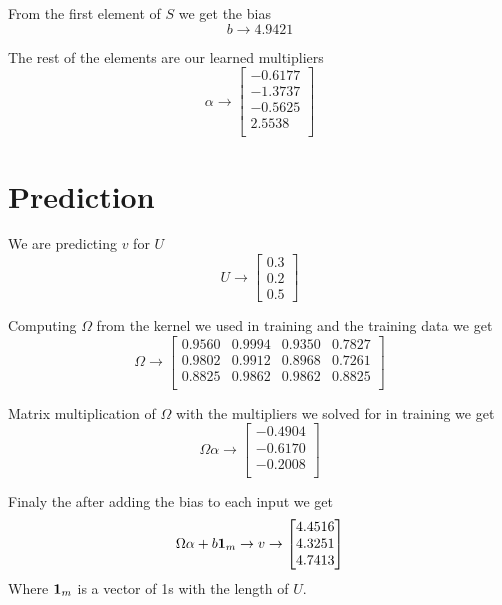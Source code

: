 \documentclass[a4paper,12pt]{scrreprt}
\begin{document}
From the first element of $S$ we get the bias
\begin{equation}
        b\to 4.9421
\end{equation}

The rest of the elements are our learned multipliers
\begin{equation}
        \alpha \to \begin{bmatrix}
                -0.6177 \\
                -1.3737 \\
                -0.5625 \\
                2.5538  \\
        \end{bmatrix}
\end{equation}

\section{Prediction}
We are predicting $v$ for $U$
\begin{equation}
        U\to \begin{bmatrix}
                0.3 \\
                0.2 \\
                0.5
        \end{bmatrix}
\end{equation}

Computing $\Omega$ from the kernel we used in training and the training data we get
\begin{equation}
        \Omega\to \begin{bmatrix}
                0.9560 & 0.9994 & 0.9350 & 0.7827 \\
                0.9802 & 0.9912 & 0.8968 & 0.7261 \\
                0.8825 & 0.9862 & 0.9862 & 0.8825 \\
        \end{bmatrix}
\end{equation}

Matrix multiplication of $\Omega$ with the multipliers we solved for in training we get
\begin{equation}
        \Omega\alpha\to \begin{bmatrix}
                -0.4904 \\
                -0.6170 \\
                -0.2008 \\
        \end{bmatrix}
\end{equation}

Finaly the after adding the bias to each input we get
\begin{equation}
        \Omega\alpha+b\vb{1}_{m}\to v\to \begin{bmatrix}
                4.4516 \\
                4.3251 \\
                4.7413 \\
        \end{bmatrix}
\end{equation}
Where $\vb{1}_{m}$ is a vector of 1s with the length of $U$.
\end{document}
